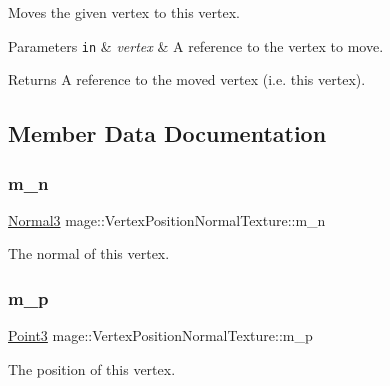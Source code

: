 Moves the given vertex to this vertex.


\begin{DoxyParams}[1]{Parameters}
\mbox{\tt in}  & {\em vertex} & A reference to the vertex to move. \\
\hline
\end{DoxyParams}
\begin{DoxyReturn}{Returns}
A reference to the moved vertex (i.\+e. this vertex). 
\end{DoxyReturn}


\subsection{Member Data Documentation}
\hypertarget{structmage_1_1_vertex_position_normal_texture_af4a15ddc9ac172226fb7e21c5f667a38}{}\label{structmage_1_1_vertex_position_normal_texture_af4a15ddc9ac172226fb7e21c5f667a38} 
\subsubsection{\texorpdfstring{m\+\_\+n}{m\_n}}
{\footnotesize\ttfamily \hyperlink{structmage_1_1_normal3}{Normal3} mage\+::\+Vertex\+Position\+Normal\+Texture\+::m\+\_\+n}

The normal of this vertex. \hypertarget{structmage_1_1_vertex_position_normal_texture_a319f201d680d9e0a3d01b081f3d6dee8}{}\label{structmage_1_1_vertex_position_normal_texture_a319f201d680d9e0a3d01b081f3d6dee8} 
\subsubsection{\texorpdfstring{m\+\_\+p}{m\_p}}
{\footnotesize\ttfamily \hyperlink{structmage_1_1_point3}{Point3} mage\+::\+Vertex\+Position\+Normal\+Texture\+::m\+\_\+p}

The position of this vertex. \hypertarget{structmage_1_1_vertex_position_normal_texture_a9429acfac77372007ea75022282341fa}{}\label{structmage_1_1_vertex_position_normal_texture_a9429acfac77372007ea75022282341fa} 
